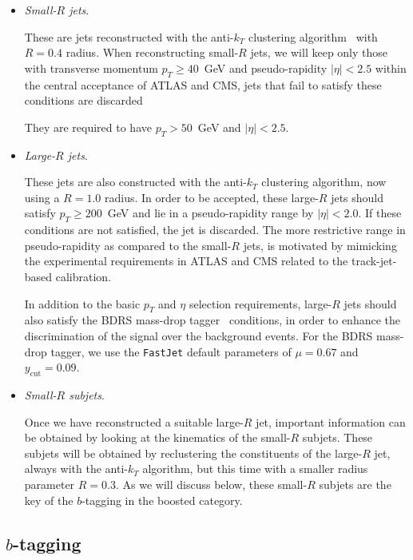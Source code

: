 \begin{itemize}
\item {\it Small-$R$ jets}.

  These are jets  reconstructed with the
  anti-$k_T$ clustering algorithm~\cite{Cacciari:2008gp} with $R=0.4$ radius.
  When reconstructing small-$R$ jets, we will keep only
  those with transverse momentum $p_T \ge 40$~GeV
  and pseudo-rapidity $|\eta|<2.5$ within the central
  acceptance of ATLAS and CMS, jets that fail to satisfy these
  conditions are discarded

  They are required to have $p_T > 50$~GeV and $|\eta|<2.5$.

\item {\it Large-$R$ jets}.

  These jets are also constructed with the
  anti-$k_T$ clustering algorithm, now using a $R=1.0$ radius.
  In order to be accepted, these large-$R$ jets should
  satisfy  $p_T \ge 200$~GeV and lie in a pseudo-rapidity range by
  $|\eta|<2.0$.
  If these conditions are not satisfied, the jet is discarded.
  The more restrictive range  in pseudo-rapidity
  as compared to the small-$R$ jets,
  is motivated by mimicking the  experimental requirements
  in ATLAS and CMS
  related to the track-jet-based calibration.

  In addition to the basic $p_T$ and $\eta$
  selection requirements, large-$R$ jets should also
  satisfy the  BDRS mass-drop tagger~\cite{Butterworth:2008iy}
  conditions, in order
  to enhance the discrimination of the signal over the background
  events.
  For the BDRS mass-drop tagger, we use the {\tt FastJet} default
  parameters of  $\mu = 0.67$ and $y_{\textrm{cut}}= 0.09$.


  
\item {\it Small-$R$ subjets}.

  Once we have reconstructed a suitable large-$R$ jet, important
  information can be obtained by looking at the kinematics of
  the small-$R$ subjets.
  These subjets will be obtained by reclustering the constituents
  of the large-$R$ jet, always with the  anti-$k_T$ algorithm,
  but this time with a smaller radius parameter $R=0.3$.
  As we will discuss below, these small-$R$ subjets are the key of
  the $b$-tagging in the boosted category.
%
  \end{itemize}


\subsection{$b$-tagging}

